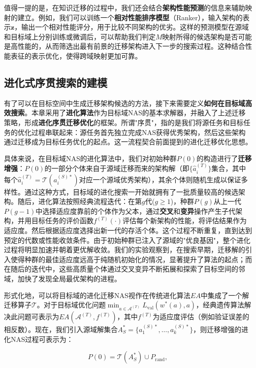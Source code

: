 \documentclass[../main.tex]{subfiles}
\begin{document}
值得一提的是，在知识迁移的过程中，我们还会结合\textbf{架构性能预测}的信息来辅助映射的建立。例如，我们可以训练一个\textbf{相对性能排序模型}（Ranker），输入架构的表示$\mathbf{z}$，输出一个相对性能评分，用于比较不同架构的优劣。这样的预测模型在源域和目标域上分别训练或微调后，可以帮助我们判定$M$映射所得的候选架构是否可能是高性能的，从而筛选出最有前景的迁移架构进入下一步的搜索过程。这种结合性能表征的表示优化，使得跨域映射更加可靠。

\subsection{进化式序贯搜索的建模}

有了可以在目标空间中生成迁移架构候选的方法，接下来需要定义\textbf{如何在目标域高效搜索}。本章采用了\textbf{进化算法}作为目标域NAS的基本求解器，并融入了上述迁移策略，形成\textbf{进化序贯迁移优化}的框架。所谓"序贯"，指的是我们将源任务和目标任务的优化过程串联起来：源任务首先独立完成NAS获得优秀架构，然后这些架构通过迁移成为目标任务优化的起点。这一流程契合前面提到的进化迁移优化思想。

具体来说，在目标域NAS的进化算法中，我们对初始种群$P(0)$的构造进行了\textbf{迁移增强}：$P(0)$的一部分个体来自于源域迁移而来的架构解（即$\{\hat{a}^{(T)}_i\}$集合，其中每个$\hat{a}^{(T)}_i = \mathcal{T}(a^{(S)*}_i)$对应一个源域优秀架构），其余个体则随机生成以保证多样性。通过这种方式，目标域的进化搜索一开始就拥有了一批质量较高的候选架构。随后，进化算法按照经典流程迭代：在第$g$代($g\ge1$)，种群$P(g)$从上一代$P(g-1)$中选择适应度靠前的个体作为父本，通过\textbf{交叉}和\textbf{变异}操作产生子代架构，并用目标任务的评价函数$f^{(T)}(\cdot)$评估每个新架构的性能，将评估结果作为适应度。然后根据适应度选择出新一代的存活个体。这个过程不断重复，直到达到预定的代数或性能收敛条件。由于初始种群已注入了源域的"优良基因"，整个进化过程将明显加速并朝着更优解收敛。我们的实验观察到，在搜索早期，迁移解的引入使得种群的最佳适应度远高于纯随机初始化的情况，显著提升了算法的起点；而在随后的迭代中，这些高质量个体通过交叉变异不断拓展和探索了目标空间的邻域，加快了发现全局最优架构的进程。

形式化地，可以将目标域的进化迁移NAS视作在传统进化算法$EA$中集成了一个解迁移算子$\mathcal{T}$。对于目标域优化问题$\min_{a \in \mathcal{A}^{(T)}} L_{\text{val}}(w^*(a), a)$，经典遗传算法解决此问题可表示为$EA(\mathcal{A}^{(T)}, f^{(T)})$，其中$f^{(T)}$为适应度评估（例如验证误差的相反数）。现在，我们引入源域解集合$A^*_S=\{a^{(S)*}_1,\dots,a^{(S)*}_k\}$，则迁移增强的进化NAS过程可表示为：

\begin{equation}
	P(0) = \mathcal{T}(A^*_S) \cup P_{\text{rand}},
\end{equation}
\end{document}
